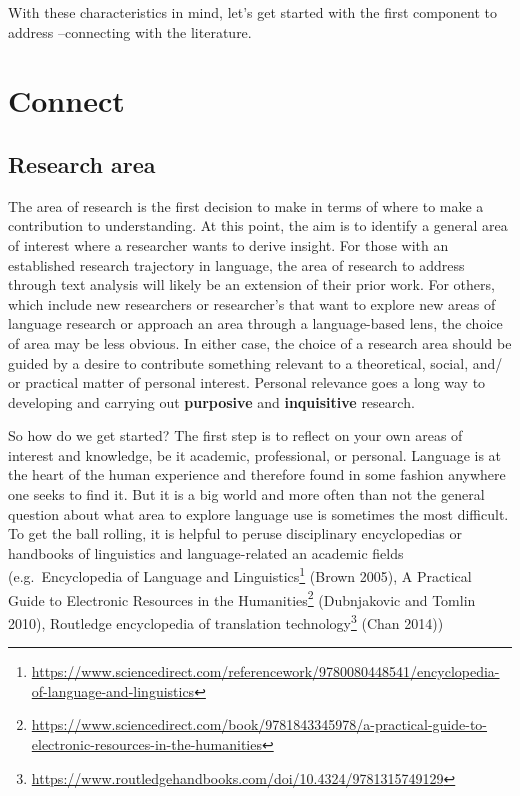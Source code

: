 \documentclass[
  letterpaper,
]{scrbook}
\DeclareRobustCommand{\href}[2]{#2\footnote{\url{#1}}}
\begin{document}
With these characteristics in mind, let's get started with the first
component to address --connecting with the literature.

\hypertarget{connect}{%
\section{Connect}\label{connect}}

\hypertarget{research-area}{%
\subsection{Research area}\label{research-area}}

The area of research is the first decision to make in terms of where to
make a contribution to understanding. At this point, the aim is to
identify a general area of interest where a researcher wants to derive
insight. For those with an established research trajectory in language,
the area of research to address through text analysis will likely be an
extension of their prior work. For others, which include new researchers
or researcher's that want to explore new areas of language research or
approach an area through a language-based lens, the choice of area may
be less obvious. In either case, the choice of a research area should be
guided by a desire to contribute something relevant to a theoretical,
social, and/ or practical matter of personal interest. Personal
relevance goes a long way to developing and carrying out
\textbf{purposive} and \textbf{inquisitive} research.

So how do we get started? The first step is to reflect on your own areas
of interest and knowledge, be it academic, professional, or personal.
Language is at the heart of the human experience and therefore found in
some fashion anywhere one seeks to find it. But it is a big world and
more often than not the general question about what area to explore
language use is sometimes the most difficult. To get the ball rolling,
it is helpful to peruse disciplinary encyclopedias or handbooks of
linguistics and language-related an academic fields
(e.g.~\href{https://www.sciencedirect.com/referencework/9780080448541/encyclopedia-of-language-and-linguistics}{Encyclopedia
of Language and Linguistics} (Brown 2005),
\href{https://www.sciencedirect.com/book/9781843345978/a-practical-guide-to-electronic-resources-in-the-humanities}{A
Practical Guide to Electronic Resources in the Humanities} (Dubnjakovic
and Tomlin 2010),
\href{https://www.routledgehandbooks.com/doi/10.4324/9781315749129}{Routledge
encyclopedia of translation technology} (Chan 2014))
\end{document}
